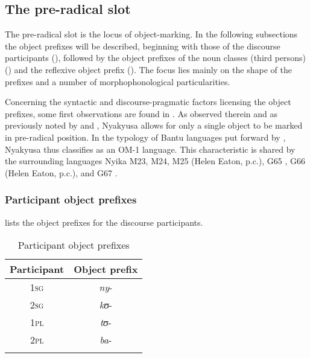 \subsection{The pre-radical slot}
\label{ObjectConcords} 
The pre-radical slot is the locus of object-marking. In the following subsections the object prefixes will be described, beginning with those of the discourse participants (), followed by the object prefixes of the noun classes (third persons) () and the reflexive object prefix (). The focus lies mainly on the shape of the prefixes and a number of morphophonological particularities.

Concerning the syntactic and discourse-pragmatic factors licensing the object prefixes, some first observations are found in \citet{LusekeloA2012}. As observed therein and as previously noted by \citet[20f]{SchumannK1899} and \citet[17--20]{EndemannC1914}, Nyakyusa allows for only a single object to be marked in pre-radical position. In the typology of Bantu languages put forward by \citet{BearthT2003}, Nyakyusa thus classifies as an OM-1 language. This characteristic is shared by the surrounding languages Nyika  M23,  M24,  M25 (Helen Eaton, p.c.),  G65 \citep{WolffR1905},  G66 (Helen Eaton, p.c.), and  G67 \citep{GrayMS}.
\subsubsection{Participant object prefixes}
\label{sectionParticipantOM}
 lists the object prefixes for the discourse participants. 
\begin{table}[H] 
	\begin{center}
		\begin{tabular}{cc}
			\lsptoprule 
			\footnotesize{Participant} & \footnotesize{Object prefix} \\ 
			\midrule 
			1\textsc{sg} & \textit{ny}- \\ 
			2\textsc{sg} & \textit{kʊ}- \\ 
			1\textsc{pl} & \textit{tʊ}- \\ 
			2\textsc{pl} & \textit{ba}-\\
			\lspbottomrule 
		\end{tabular} 
	\caption{Participant object prefixes}
	\label{OMparticipants}
	\end{center}
\end{table}

